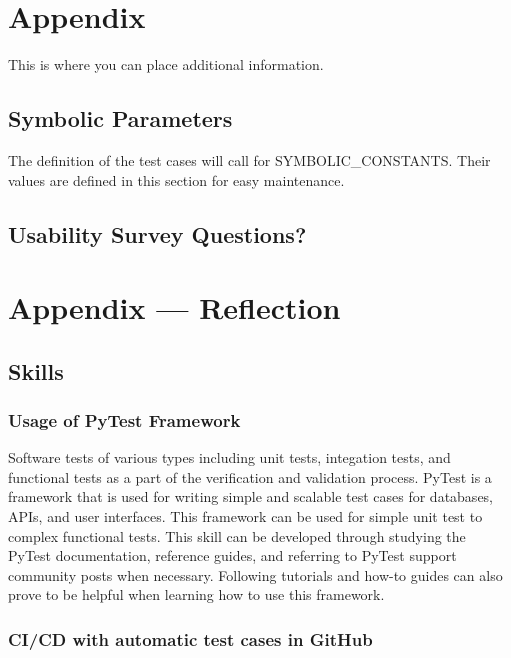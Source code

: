 \documentclass[12pt, titlepage]{article}
\begin{document}
	\newpage
	
	\section{Appendix}
	
	This is where you can place additional information.
	
	\subsection{Symbolic Parameters}
	
	The definition of the test cases will call for SYMBOLIC\_CONSTANTS.
	Their values are defined in this section for easy maintenance.
	
	\subsection{Usability Survey Questions?}
	
	
	\newpage{}
	\section*{Appendix --- Reflection}
	
	\subsection*{Skills}
	
	\subsubsection*{Usage of PyTest Framework}
	Software tests of various types including unit tests, integation tests, and functional tests as a part of the verification and validation process. PyTest is a framework that is used for writing simple and scalable test cases for databases, APIs, and user interfaces. This framework can be used for simple unit test to complex functional tests. This skill can be developed through studying the PyTest documentation, reference guides, and referring to PyTest support community posts when necessary. Following tutorials and how-to guides can also prove to be helpful when learning how to use this framework.  
	
	\subsubsection*{CI/CD with automatic test cases in GitHub}
	
\end{document}
